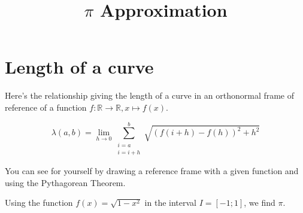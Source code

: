 \documentclass{amsart}
\title{$\pi$ Approximation}
\begin{document}
\maketitle

\section*{Length of a curve}

Here's the relationship giving the length of a curve in an orthonormal frame of reference of a 
function $f:\mathbb{R}\rightarrow\mathbb{R}, x \mapsto f(x)$.

$$\lambda(a,b)=\lim_{h\rightarrow 0}\sum_{\substack{i=a\\i=i+h}}^b \sqrt{(f(i+h)-
f(h))^2+h^2}$$

You can see for yourself by drawing a reference frame with a given function and using the Pythagorean Theorem.

Using the function $f(x)=\sqrt{1-x^2}$ in the interval $I=[-1;1]$, we find $\pi$.
\end{document}

